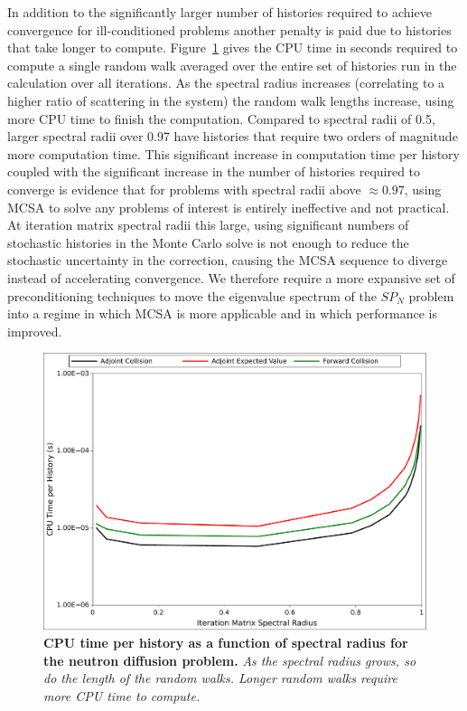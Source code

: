 In addition to the significantly larger number of histories required
to achieve convergence for ill-conditioned problems another penalty is
paid due to histories that take longer to
compute. Figure~\ref{fig:breakdown_time} gives the CPU time in seconds
required to compute a single random walk averaged over the entire set
of histories run in the calculation over all iterations. As the
spectral radius increases (correlating to a higher ratio of scattering
in the system) the random walk lengths increase, using more CPU time
to finish the computation. Compared to spectral radii of 0.5, larger
spectral radii over 0.97 have histories that require two orders of
magnitude more computation time. This significant increase in
computation time per history coupled with the significant increase in
the number of histories required to converge is evidence that for
problems with spectral radii above $\approx 0.97$, using MCSA to solve
any problems of interest is entirely ineffective and not practical. At
iteration matrix spectral radii this large, using significant numbers
of stochastic histories in the Monte Carlo solve is not enough to
reduce the stochastic uncertainty in the correction, causing the MCSA
sequence to diverge instead of accelerating convergence. We therefore
require a more expansive set of preconditioning techniques to move the
eigenvalue spectrum of the $SP_N$ problem into a regime in which MCSA
is more applicable and in which performance is improved.
\begin{figure}[t!]
  \begin{center}
    \includegraphics[width=5.75in]{chapters/spn_equations/breakdown_time.pdf}
  \end{center}
  \caption{\textbf{CPU time per history as a function of spectral
      radius for the neutron diffusion problem.} \textit{As the
      spectral radius grows, so do the length of the random
      walks. Longer random walks require more CPU time to compute.}}
  \label{fig:breakdown_time}
\end{figure}

